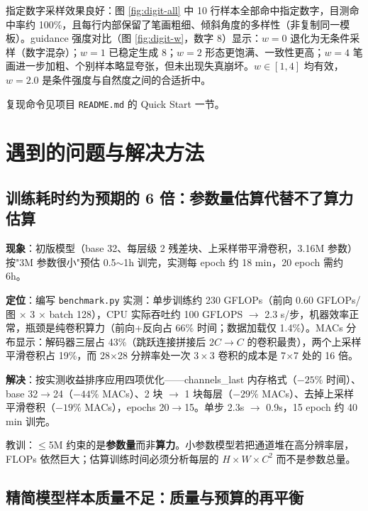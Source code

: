 \documentclass[11pt]{article}
\begin{document}
指定数字采样效果良好：图 \ref{fig:digit-all} 中 10 行样本全部命中指定数字，目测命中率约 100\%，且每行内部保留了笔画粗细、倾斜角度的多样性（非复制同一模板）。guidance 强度对比（图 \ref{fig:digit-w}，数字 8）显示：$w=0$ 退化为无条件采样（数字混杂）；$w=1$ 已稳定生成 8；$w=2$ 形态更饱满、一致性更高；$w=4$ 笔画进一步加粗、个别样本略显夸张，但未出现失真崩坏。$w\in[1,4]$ 均有效，$w=2.0$ 是条件强度与自然度之间的合适折中。

复现命令见项目 \texttt{README.md} 的 Quick Start 一节。

\section{遇到的问题与解决方法}

\subsection{训练耗时约为预期的 6 倍：参数量估算代替不了算力估算}

\textbf{现象}：初版模型（base 32、每层级 2 残差块、上采样带平滑卷积，3.16M 参数）按"3M 参数很小"预估 0.5$\sim$1h 训完，实测每 epoch 约 18 min，20 epoch 需约 6h。

\textbf{定位}：编写 \texttt{benchmark.py} 实测：单步训练约 230 GFLOPs（前向 0.60 GFLOPs/图 $\times$ 3 $\times$ batch 128），CPU 实际吞吐约 100 GFLOPS $\rightarrow$ 2.3 s/步，机器效率正常，瓶颈是纯卷积算力（前向+反向占 66\% 时间；数据加载仅 1.4\%）。MACs 分布显示：解码器三层占 43\%（跳跃连接拼接后 $2C \rightarrow C$ 的卷积最贵），两个上采样平滑卷积占 19\%，而 28$\times$28 分辨率处一次 $3\times3$ 卷积的成本是 7$\times$7 处的 16 倍。

\textbf{解决}：按实测收益排序应用四项优化——channels\_last 内存格式（$-25\%$ 时间）、base 32$\rightarrow$24（$-44\%$ MACs）、2 块 $\rightarrow$ 1 块每层（$-29\%$ MACs）、去掉上采样平滑卷积（$-19\%$ MACs），epochs 20$\rightarrow$15。单步 2.3s $\rightarrow$ 0.9s，15 epoch 约 40 min 训完。

\begin{lightnote}
教训：$\leq$5M 约束的是\textbf{参数量}而非\textbf{算力}。小参数模型若把通道堆在高分辨率层，FLOPs 依然巨大；估算训练时间必须分析每层的 $H \times W \times C^2$ 而不是参数总量。
\end{lightnote}

\subsection{精简模型样本质量不足：质量与预算的再平衡}
\end{document}
